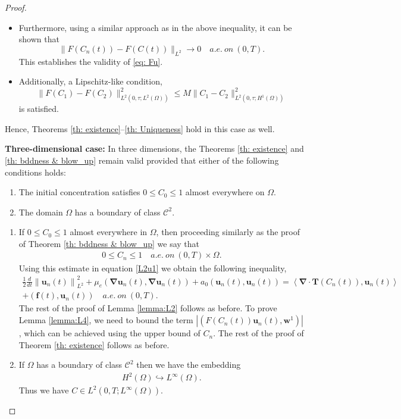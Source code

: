 \documentclass[final,3p,times]{elsarticle}
\theoremstyle{plain}
\theoremstyle{remark}
\theoremstyle{plain}
\theoremstyle{remark}
\begin{document}
\begin{proof}
\begin{itemize}
        \item Furthermore, using a similar approach as in the above inequality, it can be shown that
        \[
        \|F\left(C_n\left(t\right)\right) - F\left(C\left(t\right)\right)\|_{L^2} \to 0 \quad a.e.\ on \ \left(0,T\right).
        \]
        This establishes the validity of \eqref{eq: Fu}.  
        \item Additionally, a Lipschitz-like condition,
        \[
        \|F\left(C_1\right) - F\left(C_2\right)\|^2_{L^2\left(0,\tau;L^2(\Omega)\right)} \leq M \|C_1 - C_2\|^2_{L^2\left(0,\tau;H^1(\Omega)\right)}
        \]
        is satisfied.
   \end{itemize}
Hence, Theorems \ref{th: existence}--\ref{th: Uniqueness} hold in this case as well.
    
\textbf{Three-dimensional case:} In three dimensions, the Theorems \ref{th: existence} and \ref{th: bddness & blow_up} remain valid provided that either of the following conditions holds:
    \begin{enumerate}
        \item The initial concentration satisfies $0\le C_0\le 1$ almost everywhere on $\Omega$.
        \item The domain $\Omega$ has a boundary of class $\mathcal{C}^2$.
    \end{enumerate}
\begin{enumerate}
    \item If  $0\le C_0\le 1$ almost everywhere in $\Omega$, then proceeding similarly as the proof of Theorem \ref{th: bddness & blow_up} we say that
\begin{align}
0\leq C_n\leq1\quad a.e. \ on\ (0,T)\times \Omega. \label{ineq: 3d pol 0<c<1}
\end{align}
Using this estimate in equation \eqref{L2u1} we obtain the following inequality,
  \begin{align}
      \frac{1}{2} \frac{d}{dt} \left\| \mathbf{u}_n\left(t\right) \right\|_{L^2}^2 +\mu_e\left(\boldsymbol{\nabla} \mathbf{u}_n\left(t\right),\boldsymbol{\nabla} \mathbf{u}_n\left(t\right)\right) + a_0\left(
\mathbf{u}_n\left(t\right),\mathbf{u}_n\left(t\right)\right) = \left \langle \boldsymbol{\nabla} \cdot \mathbf{T}\left(C_n\left(t\right)\right),\mathbf{u}_n\left(t\right) \right \rangle \nonumber\\+\left(\mathbf f\left(t\right),\mathbf{u}_n\left(t\right)\right) \quad a.e. \ on\ \left(0,T\right).
        \end{align}
The rest of the proof of Lemma \ref{lemma:L2} follows as before. 
 To prove Lemma \ref{lemma:L4}, we need to bound the term $\left|\left(F(C_n(t))\mathbf u_n(t), \mathbf w^1\right)\right|$, which can be achieved using the upper bound of $C_n.$ The rest of the proof of Theorem \ref{th: existence} follows as before.
 \item If $\Omega$ has a boundary of class $\mathcal C^2$ then we have the embedding \begin{align}
     H^2(\Omega) \hookrightarrow L^\infty(\Omega).
 \end{align}
 Thus we have $C\in L^2(0,T;L^\infty(\Omega)).$
    \end{enumerate}
    \end{proof} 
\end{document}
